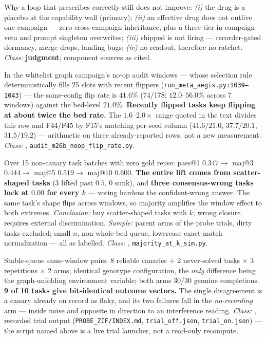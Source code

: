 \begin{description}[leftmargin=0pt,labelindent=0pt,labelsep=0pt,style=nextline,font=\normalfont,itemsep=6pt]
\item[\textbf{F40}\quad Four layers of mortality.]
Why a loop that prescribes correctly still does not improve:
\emph{(i)} the drug is a placebo at the capability wall (primary);
\emph{(ii)} an effective drug does not outlive one campaign --- zero
cross-campaign inheritance, plus a three-tier in-campaign veto and prompt
singleton overwrites; \emph{(iii)} shipped is not firing --- recorder-gated
dormancy, merge drops, landing bugs; \emph{(iv)} no readout, therefore no
ratchet. \emph{Class:} \textbf{ judgment}; component sources as
cited.

\item[\textbf{F41}\quad Volatile-family persistence --- the noise is not
      uniform.]
In the whitelist graph campaign's no-op audit windows --- whose selection
rule deterministically fills 25 slots with recent flippers
(\texttt{run\_meta\_aegis.py:1039--1043}) --- the same-config flip rate is
\textbf{$41.6\%$} (74/178; $12.0$--$56.0\%$ across 7 windows) against the
bed-level $21.0\%$. \textbf{Recently flipped tasks keep flipping at about
twice the bed rate.} The $1.6$--$2.0\times$ range quoted in the text divides this row and F44/F45 by F15's matching per-seed column ($41.6/21.0$, $37.7/20.1$, $31.5/19.2$) --- arithmetic on three already-reported  rows, not a new measurement. \emph{Class:} ,
\texttt{audit\_m26b\_noop\_flip\_rate.py}.

\item[\textbf{F42}\quad Offline majority-at-$k$ simulation.]
Over 15 non-canary task batches with zero gold reuse: pass@1 $0.347 \to$
maj@3 $0.444 \to$ maj@5 $0.519 \to$ maj@10 $0.600$. \textbf{The entire
lift comes from scatter-shaped tasks} (3 lifted past $0.5$, 0 sunk), and
\textbf{three consensus-wrong tasks lock at $0.00$ for every $k$} ---
voting hardens the confident-wrong answer. The same task's shape flips
across windows, so majority amplifies the window effect to both extremes.
\emph{Conclusion:} buy scatter-shaped tasks with $k$; wrong closure
requires external discrimination. \emph{Sample:} parent arms of the probe
trials, dirty tasks excluded; small $n$, non-whole-bed queue,
lowercase exact-match normalization --- all as labelled.
\emph{Class:} , \texttt{majority\_at\_k\_sim.py}.

\item[\textbf{F43}\quad Zero-interference replay.]
Stable-queue same-window pairs: 8 reliable canaries $+$ 2 never-solved
tasks $\times$ 3 repetitions $\times$ 2 arms, identical genotype
configuration, the \emph{only} difference being the graph-unfolding
environment variable; both arms 30/30 genuine completions.
\textbf{9 of 10 tasks give bit-identical outcome vectors.} The single
disagreement is a canary already on record as flaky, and its two failures
fall in the \emph{no-recording} arm --- inside noise and opposite in
direction to an interference reading. \emph{Class:} , recorded
trial output (\texttt{PROBE\_ZIF/INDEX.md}, \texttt{trial\_off.json},
\texttt{trial\_on.json}) --- the script named above is a live trial
launcher, not a read-only recompute.


\end{description}
